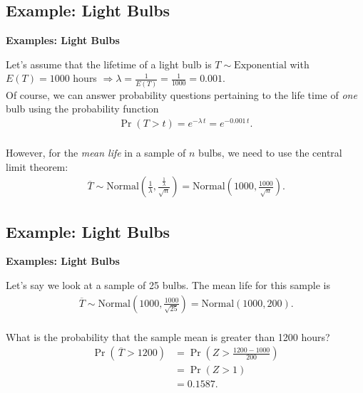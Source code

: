 \documentclass[compress]{beamer}        %
\makeatletter
\newcommand{\tcb}{\textcolor{beamer@blendedblue}}
\makeatother
\begin{document}
\subsection{Example: Light Bulbs}
\begin{frame}{\bf \tcb{Examples: Light Bulbs}}

Let's assume that the lifetime of a light bulb is $T \sim \text{Exponential}$ with $E(T) = 1000$ hours $\Rightarrow \lambda = \frac{1}{E(T)} = \frac{1}{1000} = 0.001.$\\[0.6cm]

Of course, we can answer probability questions pertaining to the life time of \emph{one} bulb using the probability function
\begin{align*}
\Pr(T > t) = e^{-\lambda\,t} = e^{-0.001\,t}.\\[-0.3cm]
\end{align*}

However, for the \emph{mean life} in a sample of $n$ bulbs, we need to use the central limit theorem:
\begin{align*}
\,\overline{\!T} \sim \text{Normal}\left(\frac{1}{\lambda}, \frac{\tfrac{1}{\lambda}}{\sqrt{n}}\right) = \text{Normal}\left(1000, \frac{1000}{\sqrt{n}}\right).
\end{align*}

\end{frame}




\subsection{Example: Light Bulbs}
\begin{frame}{\bf \tcb{Examples: Light Bulbs}}

Let's say we look at a sample of 25 bulbs. The mean life for this sample is
\begin{align*}
\,\overline{\!T} \sim \text{Normal}\left(1000, \frac{1000}{\sqrt{25}}\right) = \text{Normal}(1000, 200).\\
\end{align*}

What is the probability that the sample mean is greater than 1200 hours?
\begin{align*}
\Pr(\,\overline{\!T} > 1200) &= \Pr(Z > \tfrac{1200-1000}{200}) \\
&= \Pr(Z > 1)\\
&= 0.1587.
\end{align*}

\end{frame}
\end{document}
